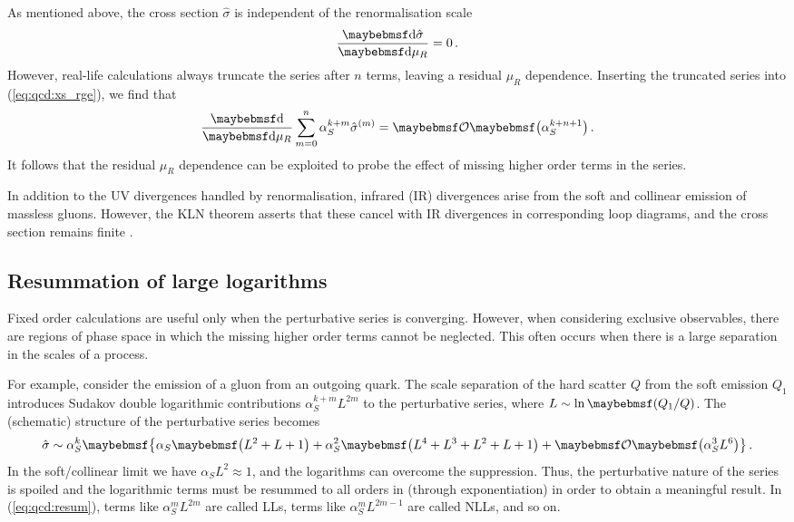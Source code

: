 As mentioned above, the cross section $\hat{\sigma}$ is independent of the 
renormalisation scale
\begin{equation}
	\frac{\d{\hat{\sigma}}}{\d{\mu_R}} = 0 \,.
	\label{eq:qcd:xs_rge}
\end{equation}
However, real-life calculations always truncate the series after $n$ terms, leaving a 
residual $\mu_R$ dependence. Inserting the truncated series into (\ref{eq:qcd:xs_rge}), 
we find that
\begin{equation}
	\frac{\d{}}{\d{\mu_R}} \sum\limits_{m=0}^{n} \alpha_S^{k+m} \hat{\sigma}^{(m)}
	= \ofOrder{\alpha_S^{k+n+1}} \,.
\end{equation}
It follows that the residual $\mu_R$ dependence can be exploited to probe the effect of 
missing higher order terms in the series.

In addition to the UV divergences handled by renormalisation, infrared (IR) divergences 
arise from the soft and collinear emission of massless gluons. However, the 
KLN theorem asserts that these cancel with IR divergences in corresponding loop diagrams, 
and the cross section remains finite \cite{Kinoshita:1962,Lee:1964}.



\subsection{Resummation of large logarithms}
\label{sec:qcd:ps}

Fixed order calculations are useful only when the perturbative series is converging. 
However, when considering exclusive observables, there are regions of phase space in 
which the missing higher order terms cannot be neglected. This often occurs when there is 
a large separation in the scales of a process.

For example, consider the emission of a gluon from an outgoing quark. The scale 
separation of the hard scatter $Q$ from the soft emission $Q_1$ introduces Sudakov double 
logarithmic contributions $\alpha_S^{k+m} L^{2m}$ to the perturbative series, where 
$L \sim \ln\parenths{Q_1 / Q}$. The (schematic) structure of the perturbative series 
becomes
\begin{equation}
	\hat{\sigma} \sim \alpha_S^k \braces{\alpha_S \parenths{L^2 + L + 1}
	+ \alpha_S^2 \parenths{L^4 + L^3 + L^2 + L + 1} + \ofOrder{\alpha_S^3 L^6}} \,.
	\label{eq:qcd:resum}
\end{equation}
In the soft/collinear limit we have $\alpha_S L^2 \approx 1$, and the logarithms can 
overcome the \alphaS suppression. Thus, the perturbative nature of the series is spoiled 
and the logarithmic terms must be resummed to all orders in \alphaS (through 
exponentiation) in order to obtain a meaningful result. In (\ref{eq:qcd:resum}), terms 
like $\alpha_S^m L^{2m}$ are called \acp{LL}, terms like $\alpha_S^{m} L^{2m-1}$ are 
called \acp{NLL}, and so on.

